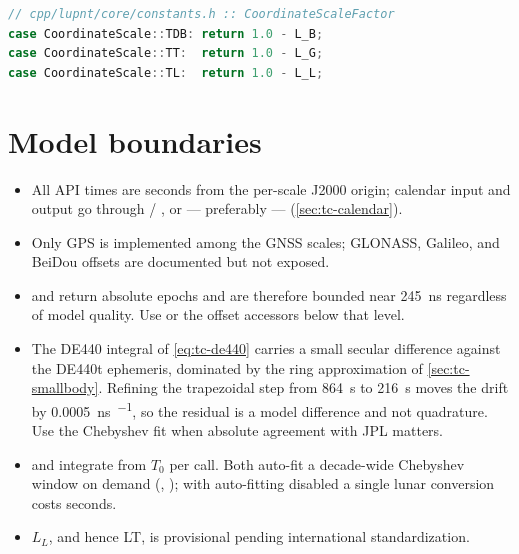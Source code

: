 \begin{lstlisting}[language=cpp]
// cpp/lupnt/core/constants.h :: CoordinateScaleFactor
case CoordinateScale::TDB: return 1.0 - L_B;
case CoordinateScale::TT:  return 1.0 - L_G;
case CoordinateScale::TL:  return 1.0 - L_L;
\end{lstlisting}

\section{Model boundaries}
\label{sec:tc-boundaries}

\begin{itemize}[leftmargin=*]
  \item All API times are seconds from the per-scale J2000 origin; calendar
    input and output go through  /
    , or --- preferably ---
     (\cref{sec:tc-calendar}).
  \item Only GPS is implemented among the GNSS scales; GLONASS, Galileo, and
    BeiDou offsets are documented but not exposed.
  \item {} and  return absolute
    epochs and are therefore bounded near \SI{245}{\nano\second} regardless of
    model quality. Use  or the offset accessors below that level.
  \item The DE440 integral of \cref{eq:tc-de440} carries a small secular
    difference against the DE440t ephemeris, dominated by the ring
    approximation of \cref{sec:tc-smallbody}. Refining the trapezoidal step
    from \SI{864}{\second} to \SI{216}{\second} moves the drift by
    \SI{0.0005}{\nano\second\per\yr}, so the residual is a model difference
    and not quadrature. Use the Chebyshev fit when absolute agreement with JPL
    matters.
  \item {} and  integrate from $T_0$ per
    call. Both auto-fit a decade-wide Chebyshev window on demand
    (, ); with auto-fitting
    disabled a single lunar conversion costs seconds.
  \item $L_L$, and hence LT, is provisional pending international
    standardization.
\end{itemize}
